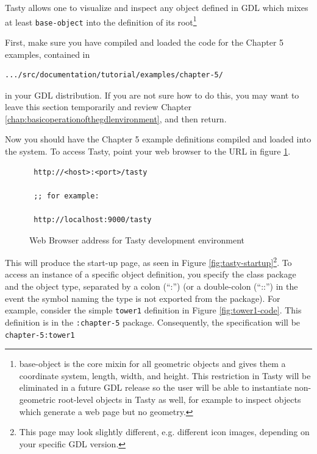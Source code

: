 \documentclass [11pt]{book}
\begin{document}
Tasty allows one to visualize and inspect any object defined
in GDL which mixes at least \texttt{base-object} into the definition of its root\footnote{base-object is the core mixin for all geometric
objects and gives them a coordinate system, length, width, and
height. This restriction in Tasty will be eliminated in a future GDL
release so the user will be able to instantiate non-geometric
root-level objects in Tasty as well, for example to inspect objects
which generate a web page but no geometry.}



First, make sure you have compiled and loaded the code for
the Chapter 5 examples, contained in 

\begin{verbatim}.../src/documentation/tutorial/examples/chapter-5/
\end{verbatim} in your GDL distribution. If you are not sure how to do this,
you may want to leave this section temporarily and review Chapter 
\ref{chap:basicoperationofthegdlenvironment}, and then return.



Now you should have the Chapter 5 example definitions
compiled and loaded into the system. To access Tasty, point your web
browser to the URL in figure
\ref{fig:tasty-toplevel-url}.
\begin{figure}
\begin{lrbox}{\boxedverb}
\begin{minipage}{\linewidth}

\begin{verbatim}
 http://<host>:<port>/tasty

 ;; for example:

 http://localhost:9000/tasty
\end{verbatim}
\end{minipage}
\end{lrbox}
\fbox{\usebox{\boxedverb}}

\caption{Web Browser address for Tasty development environment}

\label{fig:tasty-toplevel-url}

\end{figure}
This will produce the start-up page, as seen in Figure 
\ref{fig:tasty-startup}\footnote{This page may look slightly different, e.g. different
icon images, depending on your specific GDL version.}. To access an instance of a specific object definition,
you specify the class package and the object type, separated by a
colon (``:'') (or a double-colon (``::'') in the event the symbol
naming the type is not exported from the package). For example,
consider the simple \texttt{tower1} definition in Figure 
\ref{fig:tower1-code}. This definition is in the \texttt{:chapter-5} package. Consequently, the specification will be \texttt{chapter-5:tower1}
\end{document}
